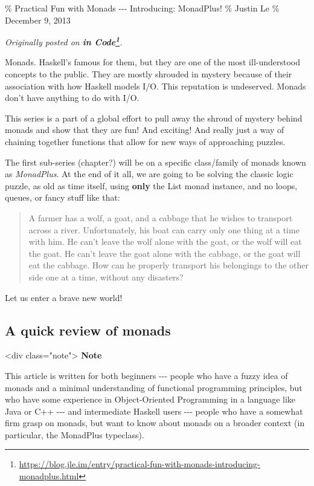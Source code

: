 \documentclass[]{article}
\renewcommand{\href}[2]{#2\footnote{\url{#1}}}
\begin{document}
\% Practical Fun with Monads -\/-\/- Introducing: MonadPlus! \% Justin Le \%
December 9, 2013

\emph{Originally posted on
\textbf{\href{https://blog.jle.im/entry/practical-fun-with-monads-introducing-monadplus.html}{in
Code}}.}

Monads. Haskell's famous for them, but they are one of the most ill-understood
concepts to the public. They are mostly shrouded in mystery because of their
association with how Haskell models I/O. This reputation is undeserved. Monads
don't have anything to do with I/O.

This series is a part of a global effort to pull away the shroud of mystery
behind monads and show that they are fun! And exciting! And really just a way of
chaining together functions that allow for new ways of approaching puzzles.

The first sub-series (chapter?) will be on a specific class/family of monads
known as \emph{MonadPlus}. At the end of it all, we are going to be solving the
classic logic puzzle, as old as time itself, using \textbf{only} the List monad
instance, and no loops, queues, or fancy stuff like that:

\begin{quote}
A farmer has a wolf, a goat, and a cabbage that he wishes to transport across a
river. Unfortunately, his boat can carry only one thing at a time with him. He
can't leave the wolf alone with the goat, or the wolf will eat the goat. He
can't leave the goat alone with the cabbage, or the goat will eat the cabbage.
How can he properly transport his belongings to the other side one at a time,
without any disasters?
\end{quote}

Let us enter a brave new world!

\subsection{A quick review of monads}

\textless{}div class="note"\textgreater{} \textbf{Note}

This article is written for both beginners -\/-\/- people who have a fuzzy idea
of monads and a minimal understanding of functional programming principles, but
who have some experience in Object-Oriented Programming in a language like Java
or C++ -\/-\/- and intermediate Haskell users -\/-\/- people who have a somewhat
firm grasp on monads, but want to know about monads on a broader context (in
particular, the MonadPlus typeclass).
\end{document}
